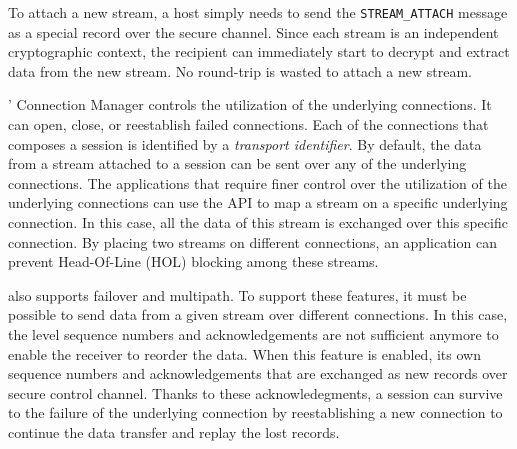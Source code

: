 To attach a new stream, a host simply needs to send the \texttt{STREAM\_ATTACH} message as a special \tls record over the secure channel. Since each stream is an independent cryptographic context, the recipient can immediately start to decrypt and extract data from the new stream. No round-trip is wasted to attach a new stream.




\tcpls' Connection Manager controls the utilization of the underlying \tcp connections. It can open, close, or reestablish failed \tcp connections. Each of
the connections that composes a \tcpls session is identified by a \emph{transport identifier}. By default, the data from a stream attached to a \tcpls session can be sent over any of the underlying \tcp connections. The applications that require finer control over the utilization of the underlying \tcp connections can use the \tcpls API to map a stream on a specific underlying connection. In this case, all the data of this stream is exchanged over this specific connection. By placing two streams on different connections, an application can prevent Head-Of-Line (HOL) blocking among these streams.

\tcpls also supports failover and multipath. To support these features, it
must be possible to send data from a given stream over different \tcp connections. In this case, the \tcp level sequence numbers and acknowledgements are not sufficient anymore to enable the receiver to reorder the data. When this feature
is enabled, \tcpls its own sequence numbers and acknowledgements that are exchanged as new \tls records over secure control channel.
Thanks to these \tcpls acknowledegments, a \tcpls session can survive to
the failure of the underlying \tcp connection by reestablishing a new
\tcp connection to continue the data transfer and replay the lost records.

